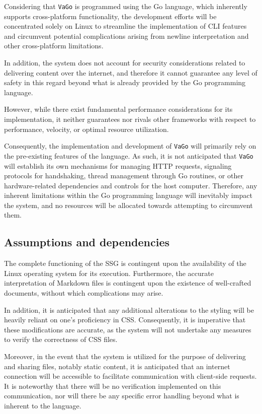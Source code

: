 Considering that \texttt{VaGo} is programmed using the Go language,
which inherently supports cross-platform functionality, the development
efforts will be concentrated solely on Linux to streamline the
implementation of CLI features and circumvent potential complications
arising from newline interpretation and other cross-platform
limitations.

In addition, the system does not account for security considerations
related to delivering content over the internet, and therefore it cannot
guarantee any level of safety in this regard beyond what is already
provided by the Go programming language.

However, while there exist fundamental performance considerations for
its implementation, it neither guarantees nor rivals other frameworks
with respect to performance, velocity, or optimal resource utilization.

Consequently, the implementation and development of \texttt{VaGo} will
primarily rely on the pre-existing features of the language. As such, it
is not anticipated that \texttt{VaGo} will establish its own mechanisms
for managing HTTP requests, signaling protocols for handshaking, thread
management through Go routines, or other hardware-related dependencies
and controls for the host computer. Therefore, any inherent limitations
within the Go programming language will inevitably impact the system,
and no resources will be allocated towards attempting to circumvent
them.

\subsection{Assumptions and
dependencies}\label{subsubsec:assumptions-and-dependencies}

The complete functioning of the SSG is contingent upon the availability
of the Linux operating system for its execution. Furthermore, the
accurate interpretation of Markdown files is contingent upon the
existence of well-crafted documents, without which complications may
arise.

In addition, it is anticipated that any additional alterations to the
styling will be heavily reliant on one's proficiency in CSS.
Consequently, it is imperative that these modifications are accurate, as
the system will not undertake any measures to verify the correctness of
CSS files.

Moreover, in the event that the system is utilized for the purpose of
delivering and sharing files, notably static content, it is anticipated
that an internet connection will be accessible to facilitate
communication with client-side requests. It is noteworthy that there
will be no verification implemented on this communication, nor will
there be any specific error handling beyond what is inherent to the
language.

